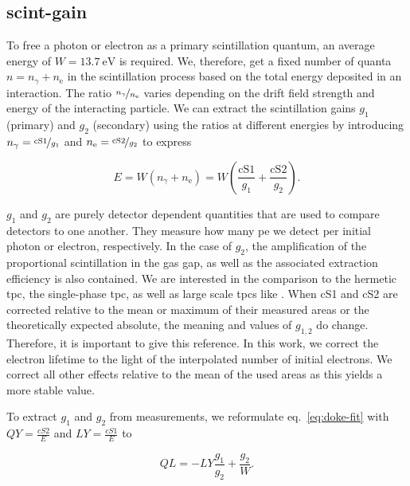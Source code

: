 
\FloatBarrier
\subsection{scint-gain}
\label{ssec:scint-gain}
\FloatBarrier


To free a photon or electron as a primary scintillation quantum, an average energy of $ W = \SI{13.7}{\electronvolt} $ is required.
We, therefore, get a fixed number of quanta $ n = n_\gamma + n_\mathrm{e} $ in the scintillation process based on the total energy deposited in an interaction.
The ratio $ \nicefrac{n_\gamma}{n_\mathrm{e}} $ varies depending on the drift field strength and energy of the interacting particle.
We can extract the scintillation gains $ g_1 $ (primary) and $ g_2 $ (secondary) using the ratios at different energies by introducing $ n_\mathrm{\gamma} = \nicefrac{\mathrm{cS1}}{g_\mathrm{1}} $ and $ n_\mathrm{e} = \nicefrac{\mathrm{cS2}}{g_\mathrm{2}} $ to express

\begin{equation}
    E = W \left( n_\gamma + n_\mathrm{e} \right) = W \left( \frac{\mathrm{cS1}}{g_1} + \frac{\mathrm{cS2}}{g_2} \right).
    \label{eq:energy-correction}
\end{equation}

$ g_1 $ and $ g_2 $ are purely detector dependent quantities that are used to compare detectors to one another.
They measure how many \gls{pe} we detect per initial photon or electron, respectively.
In the case of $ g_2 $, the amplification of the proportional scintillation in the gas gap, as well as the associated extraction efficiency is also contained.
We are interested in the comparison to the hermetic \gls{tpc}, the single-phase \gls{tpc}, as well as large scale \glspl{tpc} like \nton.
When cS1 and cS2 are corrected relative to the mean or maximum of their measured areas or the theoretically expected absolute, the meaning and values of $ g_{1,2} $ do change.
Therefore, it is important to give this reference.
In this work, we correct the electron lifetime to the light of the interpolated number of initial electrons.
We correct all other effects relative to the mean of the used areas as this yields a more stable value.

To extract $ g_1 $ and $ g_2 $ from measurements, we reformulate eq.~\ref{eq:doke-fit} with $ \mathit{QY} = \frac{cS2}{E} $ and $ \mathit{LY} = \frac{cS1}{E} $ to

\begin{equation}
    \mathit{QL} = - \mathit{LY} \frac{g_1}{g_2} + \frac{g_2}{W}.
    \label{eq:doke-fit}
\end{equation}

